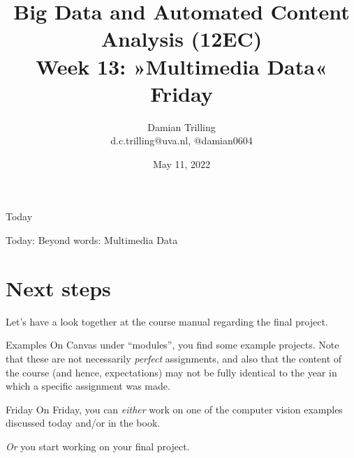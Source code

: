 

\graphicspath{{../../resources/img/}}




\title[Big Data and Automated Content Analysis]{\textbf{Big Data and Automated Content Analysis (12EC)} 
\\Week 13: »Multimedia Data«
\\Friday}
\author[Damian Trilling]{Damian Trilling\\ \footnotesize{d.c.trilling@uva.nl, @damian0604 \\}}
\date{May 11, 2022}


\begin{frame}{}
	\titlepage
\end{frame}

\begin{frame}{Today}
	\tableofcontents
\end{frame}


\begin{frame}[standout]
Today: Beyond words: Multimedia Data
\end{frame}









\section{Next steps}
\begin{frame}[standout]
Let's have a look together at the course manual regarding the final project.
\end{frame}

\begin{frame}{Examples}
On Canvas under ``modules'', you find some example projects. Note that these are not necessarily \emph{perfect} assignments, and also that the content of the course (and hence, expectations) may not be fully identical to the year in which a specific assignment was made.
\end{frame}

\begin{frame}{Friday}
On Friday, you can \emph{either} work on one of the computer vision examples discussed today and/or in the book.

\emph{Or} you start working on your final project.

\end{frame}


\begin{frame}
\printbibliography
\end{frame}




